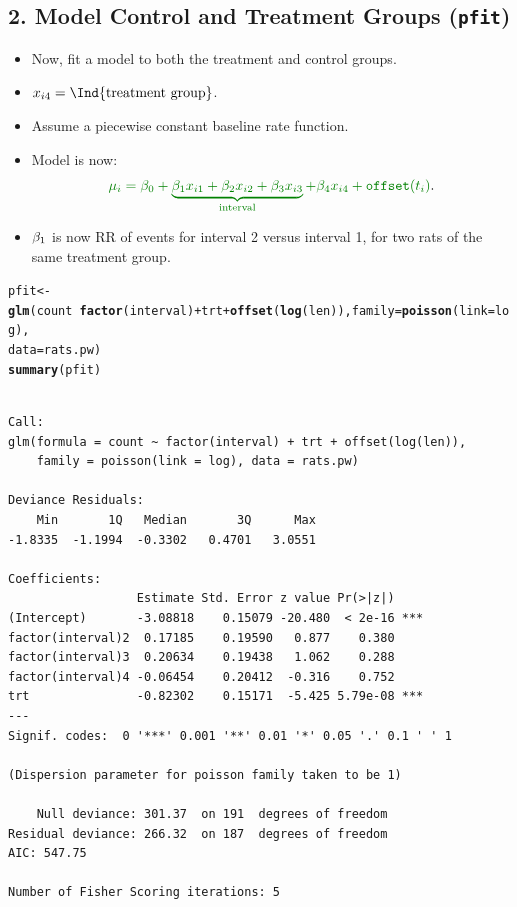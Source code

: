 \documentclass{article}\usepackage[]{graphicx}\usepackage[svgnames]{xcolor}
\makeatletter
\newcommand{\hlopt}[1]{\textcolor[rgb]{0,0,0}{#1}}%
\newcommand{\hlstd}[1]{\textcolor[rgb]{0.345,0.345,0.345}{#1}}%
\newcommand{\hlkwb}[1]{\textcolor[rgb]{0.69,0.353,0.396}{#1}}%
\newcommand{\hlkwc}[1]{\textcolor[rgb]{0.333,0.667,0.333}{#1}}%
\newcommand{\hlkwd}[1]{\textcolor[rgb]{0.737,0.353,0.396}{\textbf{#1}}}%
\newenvironment{kframe}{%
 \def\at@end@of@kframe{}%
 \ifinner\ifhmode%
  \def\at@end@of@kframe{\end{minipage}}%
  \begin{minipage}{\columnwidth}%
 \fi\fi%
 \def\FrameCommand##1{\hskip\@totalleftmargin \hskip-\fboxsep
 \colorbox{shadecolor}{##1}\hskip-\fboxsep
     \hskip-\linewidth \hskip-\@totalleftmargin \hskip\columnwidth}%
 \MakeFramed {\advance\hsize-\width
   \@totalleftmargin\z@ \linewidth\hsize
   \@setminipage}}%
 {\par\unskip\endMakeFramed%
 \at@end@of@kframe}
\newenvironment{knitrout}{}{} %
\let\exp\relax%
\let\log\relax%
\makeatother
\begin{document}
\subsection*{2. Model Control and Treatment Groups (\texttt{pfit})}
\begin{itemize}
    \item Now, fit a model to both the treatment and control groups.
    \item $ x_{i4}=\Ind{\text{treatment group}} $.
    \item Assume a piecewise constant baseline rate function.
    \item Model is now:
          \[ \textcolor{Green}{\log{\mu_i}=\beta_0+\underbrace{\beta_1x_{i1}+\beta_2x_{i2}+\beta_3x_{i3}}_{\text{interval}}+\beta_4x_{i4}+\texttt{offset}(\log{t_i})}. \]
    \item $ \exp{\beta_1} $ is now RR of events for interval 2 versus interval 1, for two rats of the
          same treatment group.
\end{itemize}
\begin{knitrout}
\color{fgcolor}\begin{kframe}
\begin{alltt}
\hlstd{pfit} \hlkwb{<-} \hlkwd{glm}\hlstd{(count} \hlopt{~} \hlkwd{factor}\hlstd{(interval)} \hlopt{+} \hlstd{trt} \hlopt{+} \hlkwd{offset}\hlstd{(}\hlkwd{log}\hlstd{(len)),} \hlkwc{family} \hlstd{=} \hlkwd{poisson}\hlstd{(}\hlkwc{link} \hlstd{= log),}
  \hlkwc{data} \hlstd{= rats.pw)}
\hlkwd{summary}\hlstd{(pfit)}
\end{alltt}
\begin{verbatim}

Call:
glm(formula = count ~ factor(interval) + trt + offset(log(len)), 
    family = poisson(link = log), data = rats.pw)

Deviance Residuals: 
    Min       1Q   Median       3Q      Max  
-1.8335  -1.1994  -0.3302   0.4701   3.0551  

Coefficients:
                  Estimate Std. Error z value Pr(>|z|)    
(Intercept)       -3.08818    0.15079 -20.480  < 2e-16 ***
factor(interval)2  0.17185    0.19590   0.877    0.380    
factor(interval)3  0.20634    0.19438   1.062    0.288    
factor(interval)4 -0.06454    0.20412  -0.316    0.752    
trt               -0.82302    0.15171  -5.425 5.79e-08 ***
---
Signif. codes:  0 '***' 0.001 '**' 0.01 '*' 0.05 '.' 0.1 ' ' 1

(Dispersion parameter for poisson family taken to be 1)

    Null deviance: 301.37  on 191  degrees of freedom
Residual deviance: 266.32  on 187  degrees of freedom
AIC: 547.75

Number of Fisher Scoring iterations: 5
\end{verbatim}
\end{kframe}
\end{knitrout}
\end{document}
